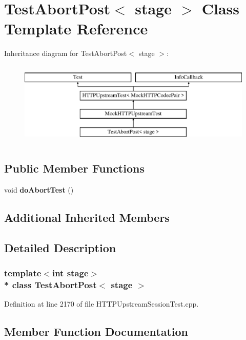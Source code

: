 \section{Test\+Abort\+Post$<$ stage $>$ Class Template Reference}
\label{classTestAbortPost}
Inheritance diagram for Test\+Abort\+Post$<$ stage $>$\+:\begin{figure}[H]
\begin{center}
\leavevmode
\includegraphics[height=4.000000cm]{classTestAbortPost}
\end{center}
\end{figure}
\subsection*{Public Member Functions}
\begin{DoxyCompactItemize}
\item 
void {\bf do\+Abort\+Test} ()
\end{DoxyCompactItemize}
\subsection*{Additional Inherited Members}


\subsection{Detailed Description}
\subsubsection*{template$<$int stage$>$\\*
class Test\+Abort\+Post$<$ stage $>$}



Definition at line 2170 of file H\+T\+T\+P\+Upstream\+Session\+Test.\+cpp.



\subsection{Member Function Documentation}
